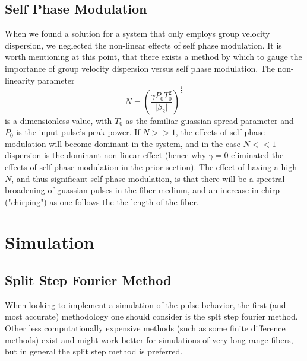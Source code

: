 \documentclass[10pt, a4paper, twocolumn]{article} %
\begin{document}
\subsection{Self Phase Modulation}
When we found a solution for a system that only employs group velocity dispersion, we neglected the non-linear effects of self phase modulation. It is worth mentioning at this point, that there exists a method by which to gauge the importance of group velocity dispersion versus self phase modulation. The non-linearity parameter \cite{AgrawalChap3}
$$N = \left(\frac{\gamma P_0 T_0^2}{\vert \beta_2 \vert}\right)^{\frac{1}{2}}$$
is a dimensionless value, with $T_0$ as the familiar guassian spread parameter and $P_0$ is the input pulse's peak power. If $N >> 1$, the effects of self phase modulation will become dominant in the system, and in the case $N << 1$ dispersion is the dominant non-linear effect (hence why $\gamma = 0$ eliminated the effects of self phase modulation in the prior section)\cite{AgrawalChap3}. The effect of having a high $N$, and thus significant self phase modulation, is that there will be a spectral broadening of guassian pulses in the fiber medium, and an increase in chirp ("chirping") as one follows the the length of the fiber.

\section{Simulation}

\subsection{Split Step Fourier Method}
When looking to implement a simulation of the pulse behavior, the first (and most accurate) methodology one should consider is the splt step fourier method. Other less computationally expensive methods (such as some finite difference methods) exist and might work better for simulations of very long range fibers, but in general the split step method is preferred.
\end{document}
